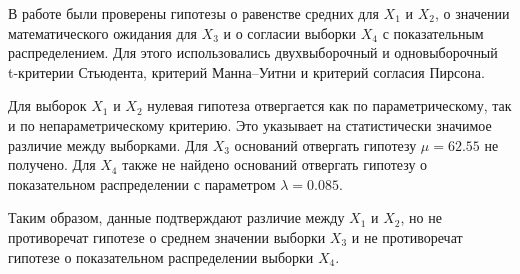 \documentclass[12pt,a4paper]{article}
\newcommand{\num}[1]{#1}
\begin{document}
В работе были проверены гипотезы о равенстве средних для $X_1$ и $X_2$, о значении математического ожидания для $X_3$ и о согласии выборки $X_4$ с показательным распределением. Для этого использовались двухвыборочный и одновыборочный t-критерии Стьюдента, критерий Манна--Уитни и критерий согласия Пирсона.

Для выборок $X_1$ и $X_2$ нулевая гипотеза отвергается как по параметрическому, так и по непараметрическому критерию. Это указывает на статистически значимое различие между выборками. Для $X_3$ оснований отвергать гипотезу $\mu=\num{62.55}$ не получено. Для $X_4$ также не найдено оснований отвергать гипотезу о показательном распределении с параметром $\lambda=\num{0.085}$.

Таким образом, данные подтверждают различие между $X_1$ и $X_2$, но не противоречат гипотезе о среднем значении выборки $X_3$ и не противоречат гипотезе о показательном распределении выборки $X_4$.
\end{document}
